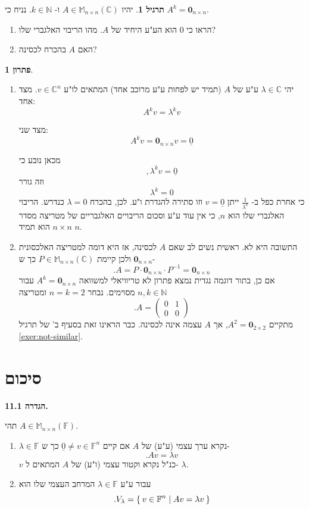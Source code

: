 \documentclass[12pt]{report}
\theoremstyle{plain}
\theoremstyle{definition}
\newtheorem{exercise}{תרגיל}[chapter]
\newtheorem*{solution}{פתרון}
\newcommand{\N}{\mathbb{N}}
\newcommand{\C}{\mathbb{C}}
\newcommand{\F}{\mathbb{F}}
\newcommand{\M}{\mathbb{M}}
\newcommand{\0}{\mathbf{0}}
\begin{document}
\begin{exercise}
יהיו
$A\in\M_{n\times n}(\C)$
ו-
$k\in\N$.
נניח כי
$A^k=\0_{n\times n}$.
\begin{enumerate}[label=\alph*.]
\item 
הראו כי 
$0$
הוא הע"ע היחיד של 
$A$.
מהו הריבוי האלגברי שלו?


\item
האם 
$A$
בהכרח לכסינה?


\end{enumerate}
\end{exercise}

\begin{solution}\
\begin{enumerate}[label=\alph*.]
\item 
יהי
$\lambda\in\C$
ע"ע של
$A$
(תמיד יש לפחות ע"ע מרוכב אחד)
המתאים לו"ע
$v\in\C^n$.
מצד אחד:
$$
A^kv=\lambda^kv
$$

מצד שני:
$$
A^kv=\0_{n\times n}v=\underline{0}
$$

מכאן נובע כי
$$
,\lambda^k v=\underline{0}
$$
וזה גורר
$$
\lambda^k=0
$$
כי אחרת כפל ב-
$\frac{1}{\lambda^k}$
ייתן
$v=\underline{0}$
וזו סתירה להגדרת ו"ע.
לכן, בהכרח
$\lambda=0$ 
כנדרש. הריבוי האלגברי שלו הוא
$n$,
כי אין עוד ע"ע וסכום הריבויים האלגבריים של מטריצה מסדר 
$n\times n$
הוא תמיד 
$n$.


\item
התשובה היא לא. ראשית נשים לב שאם 
$A$
לכסינה, אז היא דומה למטריצה האלכסונית
$\0_{n\times n}$
ולכן קיימת
$P\in\M_{n\times n}(\C)$
כך ש-
$$
.A=P\cdot\0_{n\times n}\cdot P^{-1}=\0_{n\times n}
$$
אם כן, בתור דוגמה נגדית נמצא פתרון לא טריוויאלי למשוואה 
$A^k=\0_{n\times n}$
עבור 
$n,k\in\N$
מסוימים. נבחר
$n=k=2$
ומטריצה
$$
.A=\begin{pmatrix}
0 & 1 \\
0 & 0
\end{pmatrix}
$$
מתקיים
$A^2=\0_{2\times 2}$,
אך
$A$
עצמה אינה לכסינה. כבר הראינו זאת בסעיף ב' של תרגיל
\ref{exer:not-similar}.

\end{enumerate}
\end{solution}

\clearpage
\section{סיכום}

\noindent\textbf{הגדרה 11.1.}

תהי
$A\in\M_{n\times n}(\F)$.
\begin{enumerate}[label=\alph*.]
\item 
$\lambda\in\F$
נקרא ערך עצמי (ע"ע) של
$A$
אם קיים
$\underline{0}\neq v\in\F^n$
כך ש-
$$
.Av=\lambda v
$$
$v$
כנ"ל נקרא וקטור עצמי (ו"ע) של 
$A$
המתאים ל-
$\lambda$.


\item 
עבור ע"ע 
$\lambda\in\F$
המרחב העצמי שלו הוא
$$
.V_{\lambda}=\Set{v\in\F^n|Av=\lambda v}
$$


\end{enumerate}
\bigskip
\bigskip
\end{document}
